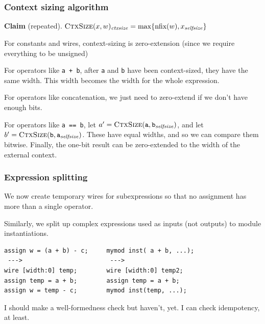 \documentclass[mathserif]{beamer}
\newcommand{\ctxs}{\ensuremath{\textsc{CtxSize}}}
\begin{document}
\begin{frame}
\frametitle{Context sizing algorithm}

{\bf Claim} (repeated). $\ctxs(x,w)_{\mathit{ctxsize}} = \max\{ \textrm{nfix}(w), x_{\mathit{selfsize}} \}$

\bigskip

For constants and wires, context-sizing is zero-extension (since we require 
everything to be unsigned)

\bigskip

For operators like \texttt{a + b}, after {\tt a} and {\tt b} have been context-sized,
they have the same width.  This width becomes the width for the whole expression.

\bigskip

For operators like concatenation, we just need to zero-extend if we don't have 
enough bits.

\bigskip

For operators like \texttt{a == b}, let $a' =
\ctxs(\texttt{a},\texttt{b}_{\mathit{selfsize}})$, and let $b' =
\ctxs(\texttt{b},\texttt{a}_{\mathit{selfsize}})$.  These have equal widths,
and so we can compare them bitwise.  Finally, the one-bit result can be
zero-extended to the width of the external context.
\end{frame}


\begin{frame}[fragile]
\frametitle{Expression splitting}

We now create temporary wires for subexpressions so that no assignment has 
more than a single operator.  

\bigskip

Similarly, we split up complex expressions used as inputs (not outputs) to 
module instantiations.

\begin{verbatim}
assign w = (a + b) - c;     mymod inst( a + b, ...);
 --->                        --->
wire [width:0] temp;        wire [width:0] temp2;
assign temp = a + b;        assign temp = a + b;
assign w = temp - c;        mymod inst(temp, ...);
\end{verbatim}

I should make a well-formedness check but haven't, yet.  I can check 
idempotency, at least.

\end{frame}
\end{document}
